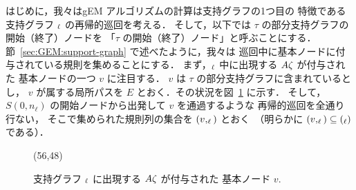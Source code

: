 {はじめに，我々はgEM アルゴリズムの計算は支持グラフの1つ目の
特徴である支持グラフ $_\ell$ の再帰的巡回を考える．
そして，以下では $\tau$ の部分支持グラフの開始（終了）ノードを
「$\tau$ の開始（終了）ノード」と呼ぶことにする．
節~\ref{sec:GEM:support-graph} で述べたように，我々は
巡回中に基本ノードに付与されている規則を集めることにする．
まず，$_\ell$ 中に出現する $A\zeta$ が付与された
基本ノードの一つ $v$ に注目する．
$v$ は $\tau$ の部分支持グラフに含まれているとし，
$v$ が属する局所パスを $E$ とおく．その状況を図~\ref{fig:v-in-sg}
に示す．
そして，$S(0,n_\ell)$ の開始ノードから出発して $v$ を通過するような 
再帰的巡回を全通り行ない，
そこで集められた規則列の集合を $(v,_\ell)$ とおく\
（明らかに $(v,_\ell)\subseteq(_\ell)$ である）．

\begin{figure}[b]
\atari(56,48)
\caption{支持グラフ $_\ell$ に出現する $A\zeta$ が付与された
基本ノード $v$.}
\label{fig:v-in-sg}
\end{figure}

}
